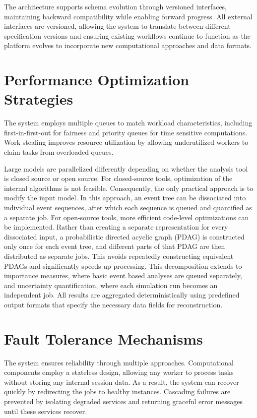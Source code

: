 

The architecture supports schema evolution through versioned interfaces, maintaining backward compatibility while enabling forward progress. All external interfaces are versioned, allowing the system to translate between different specification versions and ensuring existing workflows continue to function as the platform evolves to incorporate new computational approaches and data formats.

\section{Performance Optimization Strategies}
The system employs multiple queues to match workload characteristics, including first-in-first-out for fairness and priority queues for time sensitive computations. Work stealing improves resource utilization by allowing underutilized workers to claim tasks from overloaded queues.

Large models are parallelized differently depending on whether the analysis tool is closed source or open source. For closed-source tools, optimization of the internal algorithms is not feasible. Consequently, the only practical approach is to modify the input model. In this approach, an event tree can be dissociated into individual event sequences, after which each sequence is queued and quantified as a separate job. For open-source tools, more efficient code-level optimizations can be implemented. Rather than creating a separate representation for every dissociated input, a probabilistic directed acyclic graph (PDAG) is constructed only once for each event tree, and different parts of that PDAG are then distributed as separate jobs. This avoids repeatedly constructing equivalent PDAGs and significantly speeds up processing.
This decomposition extends to importance measures, where basic event based analyses are queued separately, and uncertainty quantification, where each simulation run becomes an independent job. All results are aggregated deterministically using predefined output formats that specify the necessary data fields for reconstruction.

\section{Fault Tolerance Mechanisms}
The system ensures reliability through multiple approaches. Computational components employ a stateless design, allowing any worker to process tasks without storing any internal session data. As a result, the system can recover quickly by redirecting the jobs to healthy instances. Cascading failures are prevented by isolating degraded services and returning graceful error messages until these services recover.

